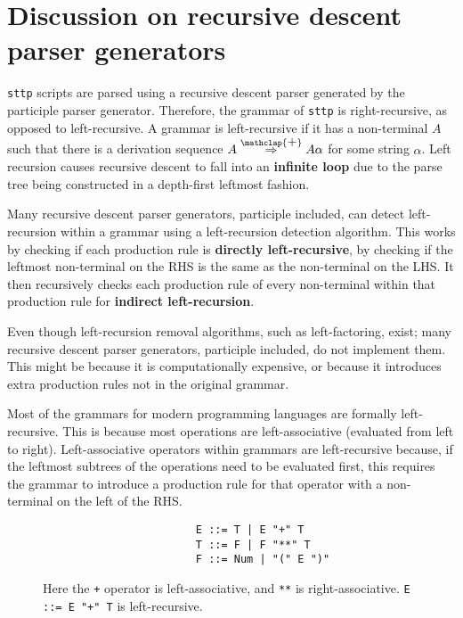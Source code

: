 \chapter{Discussion on recursive descent parser generators}
\label{chap:discussion}

\verb|sttp| scripts are parsed using a recursive descent parser generated by the participle parser generator. Therefore, the grammar of \verb|sttp| is right-recursive, as opposed to left-recursive. A grammar is left-recursive if it has a non-terminal $A$ such that there is a derivation sequence $A \stackrel{\mathclap{\normalfont\mbox{+}}}{\Rightarrow} A \alpha$ for some string $\alpha$. Left recursion causes recursive descent to fall into an \textbf{infinite loop} due to the parse tree being constructed in a depth-first leftmost fashion\textsuperscript{\cite{scott_johnstone_1998}}.

Many recursive descent parser generators, participle included, can detect left-recursion within a grammar using a left-recursion detection algorithm. This works by checking if each production rule is \textbf{directly left-recursive}, by checking if the leftmost non-terminal on the RHS is the same as the non-terminal on the LHS. It then recursively checks each production rule of every non-terminal within that production rule for \textbf{indirect left-recursion}.

Even though left-recursion removal algorithms, such as left-factoring, exist; many recursive descent parser generators, participle included, do not implement them. This might be because it is computationally expensive, or because it introduces extra production rules not in the original grammar.

Most of the grammars for modern programming languages are formally left-recursive. This is because most operations are left-associative (evaluated from left to right). Left-associative operators within grammars are left-recursive because, if the leftmost subtrees of the operations need to be evaluated first, this requires the grammar to introduce a production rule for that operator with a non-terminal on the left of the RHS.

\begin{figure}[H]
    \begin{center}
        \begin{verbatim}
                        E ::= T | E "+" T
                        T ::= F | F "**" T
                        F ::= Num | "(" E ")"
        \end{verbatim}
    \end{center}
    \vspace{-1.5em}
    \cprotect\caption{\label{fig:4.1}Here the \verb|+| operator is left-associative, and \verb|**| is right-associative. \verb|E ::= E "+" T| is left-recursive.}
\end{figure}

